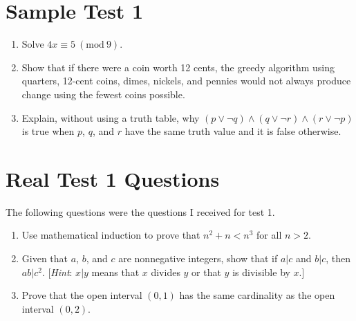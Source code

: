\documentclass[letterpaper, 12pt]{article}
\newcommand{\PMod}[1]{\ (\mathrm{mod}\ #1)}
\begin{document}
\section{Sample Test 1}

\begin{enumerate}
    \item Solve $4x \equiv 5 \PMod{9}$.
    \item Show that if there were a coin worth 12 cents, the greedy algorithm using quarters, 12-cent coins, dimes, nickels, and pennies would not always produce change using the fewest coins possible.
    \item Explain, without using a truth table, why $(p \lor \neg q) \land (q \lor \neg r) \land (r \lor \neg p)$ is true when $p$, $q$, and $r$ have the same truth value and it is false otherwise.
\end{enumerate}

\section{Real Test 1 Questions}
The following questions were the questions I received for test 1.

\begin{enumerate}
    \item Use mathematical induction to prove that $n^2 + n < n^3$ for all $n > 2$.
    \item Given that $a$, $b$, and $c$ are nonnegative integers, show that if $a|c$ and $b|c$, then $ab|c^2$. [\textit{Hint}: $x|y$ means that $x$ divides $y$ or that $y$ is divisible by $x$.]
    \item Prove that the open interval $(0, 1)$ has the same cardinality as the open interval $(0, 2)$.
\end{enumerate}
\end{document}
